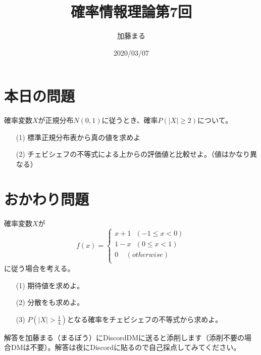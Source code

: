 \documentclass[a4j,uplatex]{jsarticle}
\title{確率情報理論第7回}
\author{加藤まる}
\date{2020/03/07}
\begin{document}
\maketitle

\section*{本日の問題}
確率変数$X$が正規分布$N(0,1)$に従うとき、確率$P(|X|\ge2)$について。
\begin{itemize}
  \item[(1)] 標準正規分布表から真の値を求めよ
  \item[(2)] チェビシェフの不等式による上からの評価値と比較せよ。（値はかなり異なる） 
\end{itemize}


\section*{おかわり問題}
確率変数$X$が
\begin{equation}
  f(x)=
 \begin{cases}
   x+1~~~(-1\le x<0)\\
   1-x~~~(0\le x<1)\\
   0~~~~~(otherwise)\\
 \end{cases}
\end{equation}
に従う場合を考える。
\begin{itemize}
  \item[(1)] 期待値を求めよ。
  \item[(2)] 分散をも求めよ。
  \item[(3)] $P(|X|>\frac{1}{4})$となる確率をチェビシェフの不等式から求めよ。\\
\end{itemize}
解答を加藤まる（まるぼう）にDiscordDMに送ると添削します（添削不要の場合DMは不要）。解答は夜にDiscordに貼るので自己採点してみてください。
\end{document}
